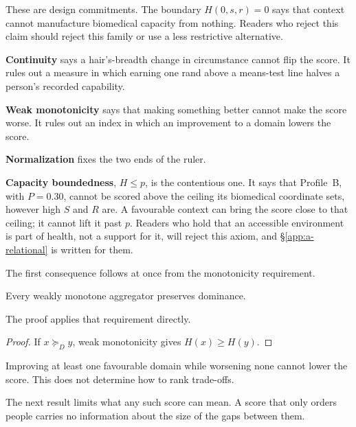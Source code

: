\begin{remark}
These are design commitments. The boundary $H(0,s,r)=0$ says that context
cannot manufacture biomedical capacity from nothing. Readers who reject this
claim should reject this family or use a less restrictive alternative.
\end{remark}

\begin{reading}
\textbf{Continuity} says a hair's-breadth change in circumstance cannot flip
the score. It rules out a measure in which earning one rand above a means-test
line halves a person's recorded capability.

\textbf{Weak monotonicity} says that making something better cannot make the
score worse. It rules out an index in which an improvement to a domain lowers the score.

\textbf{Normalization} fixes the two ends of the ruler.

\textbf{Capacity boundedness}, $H\le p$, is the contentious one. It says that
Profile~B, with $P=0.30$, cannot be scored above the ceiling its biomedical
coordinate sets, however high $S$ and $R$ are. A favourable context can bring
the score close to that ceiling; it cannot lift it past $p$. Readers who hold
that an accessible environment is part of health, not a support for it, will
reject this axiom, and \S\ref{app:a-relational} is written for them.
\end{reading}

The first consequence follows at once from the monotonicity requirement.

\begin{proposition}
Every weakly monotone aggregator preserves dominance.
\end{proposition}
The proof applies that requirement directly.
\begin{proof}
If $x\succeq_Dy$, weak monotonicity gives $H(x)\ge H(y)$.
\end{proof}

\begin{remark}
Improving at least one favourable domain while worsening none cannot lower the
score. This does not determine how to rank trade-offs.
\end{remark}

The next result limits what any such score can mean. A score that only orders
people carries no information about the size of the gaps between them.

